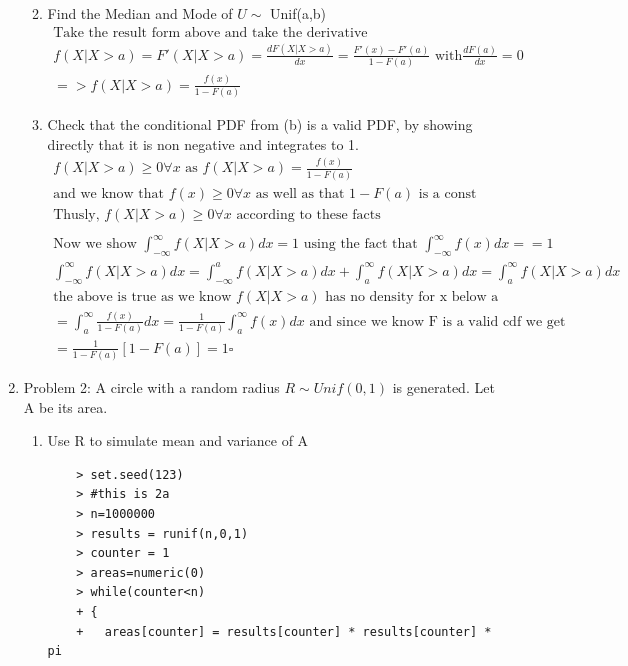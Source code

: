 \documentclass[11pt]{article}
\begin{document}
\begin{enumerate}
\begin{enumerate}
\begin{figure}[H]
	\end{figure}
	\item Find the Median and Mode of $U \sim $ Unif(a,b)
	\begin{gather}
	\text{Take the result form above and take the derivative }\\
	f(X|X>a) = F'(X|X>a) = \frac{dF(X|X>a)}{dx} = \frac{F'(x)-F'(a)}{1-F(a)} \text{ with} \frac{dF(a)}{dx} = 0 \\
	=> f(X|X>a) =\frac{f(x)}{1-F(a)}
	\end{gather}
	\item Check that the conditional PDF from (b) is a valid PDF, by showing directly that it is non negative and integrates to 1.
	\begin{gather}
	f(X|X>a) \ge 0 \forall x \text{ as } f(X|X>a) =\frac{f(x)}{1-F(a)} \\
	\text{and we know that } f(x) \ge 0 \forall x \text{ as well as that } 1-F(a) \text{ is a const}
	\\
	\text{Thusly, } f(X|X>a) \ge 0 \forall x \text{ according to these facts}
	\\
	\\
	\text{Now we show } \int_{-\infty}^{\infty} f(X|X>a)dx = 1 \text{ using the fact that } \int_{-\infty}^{\infty} f(x)dx =  = 1 \\
	\int_{-\infty}^{\infty} f(X|X>a)dx = \int_{-\infty}^{a} f(X|X>a)dx + \int_{a}^{\infty} f(X|X>a)dx = \int_{a}^{\infty} f(X|X>a)dx\\
	\text{the above is true as we know $f(X|X>a)$ has no density for x below a}
	\\
	=\int_{a}^{\infty} \frac{f(x)}{1-F(a)}dx = \frac{1}{1-F(a)}\int_{a}^{\infty} f(x)dx \text{ and since we know F is a valid cdf we get }\\
	= \frac{1}{1-F(a)}[1 -F(a)] = 1 \square 
	\end{gather}
\end{enumerate}
\item Problem 2: A circle with a random radius $R \sim Unif(0,1)$ is generated. Let A be its area.
\\
\begin{enumerate}
	\item Use R to simulate mean and variance of A
	\\
	\begin{verbatim}
	> set.seed(123)
	> #this is 2a
	> n=1000000
	> results = runif(n,0,1)
	> counter = 1
	> areas=numeric(0)
	> while(counter<n)
	+ {
	+   areas[counter] = results[counter] * results[counter] * pi

\end{verbatim}
\end{enumerate}
\end{enumerate}
\end{document}
